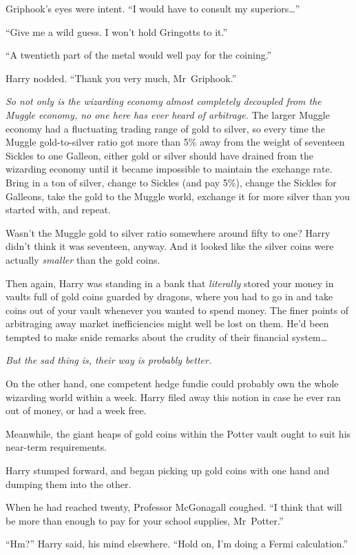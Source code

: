 Griphook’s eyes were intent. “I would have to consult my superiors…”

“Give me a wild guess. I won’t hold Gringotts to it.”

“A twentieth part of the metal would well pay for the coining.”

Harry nodded. “Thank you very much, Mr~Griphook.”

\emph{So not only is the wizarding economy almost completely decoupled from the Muggle economy, no one here has ever heard of arbitrage.} The larger Muggle economy had a fluctuating trading range of gold to silver, so every time the Muggle gold-to-silver ratio got more than 5\% away from the weight of seventeen Sickles to one Galleon, either gold or silver should have drained from the wizarding economy until it became impossible to maintain the exchange rate. Bring in a ton of silver, change to Sickles (and pay 5\%), change the Sickles for Galleons, take the gold to the Muggle world, exchange it for more silver than you started with, and repeat.

Wasn’t the Muggle gold to silver ratio somewhere around fifty to one? Harry didn’t think it was seventeen, anyway. And it looked like the silver coins were actually \emph{smaller} than the gold coins.

Then again, Harry was standing in a bank that \emph{literally} stored your money in vaults full of gold coins guarded by dragons, where you had to go in and take coins out of your vault whenever you wanted to spend money. The finer points of arbitraging away market inefficiencies might well be lost on them. He’d been tempted to make snide remarks about the crudity of their financial system…

\emph{But the sad thing is, their way is probably better.}

On the other hand, one competent hedge fundie could probably own the whole wizarding world within a week. Harry filed away this notion in case he ever ran out of money, or had a week free.

Meanwhile, the giant heaps of gold coins within the Potter vault ought to suit his near-term requirements.

Harry stumped forward, and began picking up gold coins with one hand and dumping them into the other.

When he had reached twenty, Professor McGonagall coughed. “I think that will be more than enough to pay for your school supplies, Mr~Potter.”

“Hm?” Harry said, his mind elsewhere. “Hold on, I’m doing a Fermi calculation.”

